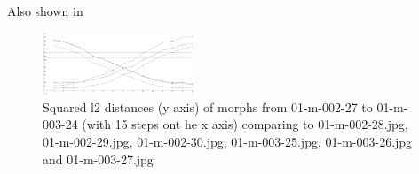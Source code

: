 
Also shown in 
\begin{figure}[htbp] 
	\centering
	\includegraphics[width=0.4\textwidth]{Resources/result1.jpg}
	\caption{Squared l2 distances (y axis) of morphs from 01-m-002-27 to 01-m-003-24 (with 15 steps ont he x axis) comparing to 01-m-002-28.jpg, 01-m-002-29.jpg, 01-m-002-30.jpg, 01-m-003-25.jpg, 01-m-003-26.jpg and 01-m-003-27.jpg}
	\label{fig}
\end{figure}

